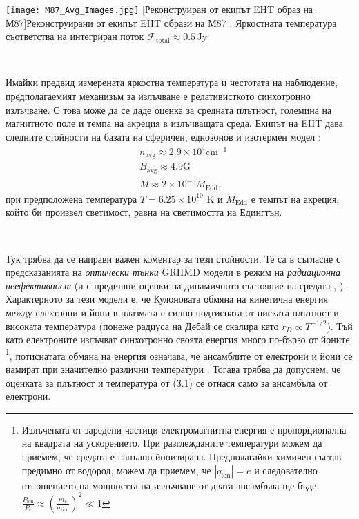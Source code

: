 \noindent\begin{minipage}{15em}
	\centering
	\texttt{[image: М87\_Avg\_Images.jpg]}
	[Реконструиран от екипът EHT образ на М87]{\small Реконструирани от екипът EHT образи на М87 \cite{EHT_M87_I}. Яркостната температура съответства на интегриран поток $\mathcal{F}_{\text{total}}\approx0.5\,\text{Jy}$}
	\label{M87_I_Image}
\end{minipage}\,\,
\begin{minipage}{20em}
	Имайки предвид измерената яркостна температура и честотата на наблюдение, предполагаемият механизъм за излъчване е релативисткото синхотронно излъчване. С това може да се даде оценка за средната плътност, големина на магнитното поле и темпа на акреция в излъчващата среда. Екипът на EHT дава следните стойности на базата на сферичен, еднозонов и изотермен модел \cite{EHT_M87_V}:
	\begin{equation}
		\begin{aligned}
			&n_{\text{avg}} \approx 2.9\times 10^{4} \text{cm}^{-1}\\
			&B_{\text{avg}} \approx 4.9 \text{G}\\
			&\dot{M} \approx 2 \times 10^{-5} \dot{M}_{\text{Edd}},
		\end{aligned}
	\end{equation}
	при предположена температура $T = 6.25\times 10^{10}$ K и $\dot{M}_{\text{Edd}}$ е темпът на акреция, който би произвел светимост, равна на светимостта на Едингтън. 
\end{minipage}\\\newline

Тук трябва да се направи важен коментар за тези стойности. Те са в съгласие с предсказанията на \emph{оптически тънки} GRHMD модели в режим на \emph{радиационна неефективност} (и с предишни оценки на динамичното състояние на средата \cite{Kuo2014}, \cite{Walsh2013}). Характерното за тези модели е, че Кулоновата обмяна на кинетична енергия между електрони и йони в плазмата е силно подтисната от ниската плътност и високата температура (понеже радиуса на Дебай се скалира като $r_D \propto T^{-1/2}$). Тъй като електроните излъчват синхотронно своята енергия много по-бързо от йоните \footnote{ Излъчената от заредени частици електромагнитна енергия е пропорционална на квадрата на ускорението. При разглежданите температури можем да приемем, че средата е напълно йонизирана. Предполагайки химичен състав предимно от водород, можем да приемем, че $|q_{\text{ion}}| = e$ и следователно отношението на мощността на излъчване от двата ансамбъла ще бъде $\frac{P_{\text{ion}}}{P_e} \approx \left(\frac{m_e}{m_{\text{ion}}}\right)^2 \ll 1$
}, потиснатата обмяна на енергия означава, че ансамблите от електрони и йони се намират при значително различни температури \cite{Yuan2014}. Тогава трябва да допуснем, че оценката за плътност и температура от (3.1) се отнася само за ансамбъла от електрони.\\

